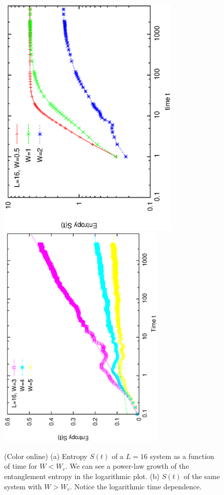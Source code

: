 \documentclass[prl,aps,epsf,showpacs,twocolumn]{revtex4}
\begin{document}
\begin{figure}[b]
  \includegraphics[angle=-90, origin=c,  width=3.4in]{newfig1a.ps}\\
  \vspace{-0.6in}
  \includegraphics[angle=-90,width=3.1in]{newfig1b.ps}\\
  \vspace{0.1in}
  \caption{(Color online) (a) Entropy $S(t)$ of a $L=16$ system as a function of
    time for $W < W_c$.
    We can see a power-law growth of the entanglement entropy in the logarithmic
    plot.
    (b) $S(t)$ of the same system with $W > W_c$. Notice the logarithmic time
    dependence.
  }
\label{fig2}
\end{figure}
\end{document}
